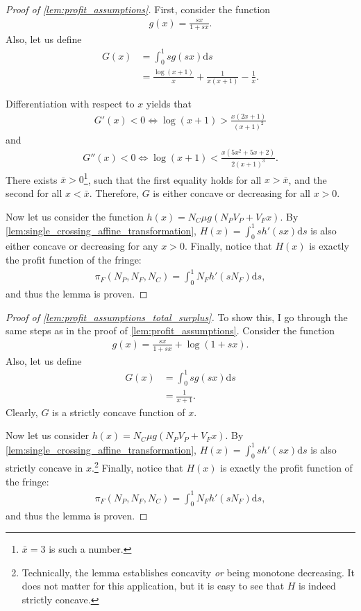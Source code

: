 \documentclass[a4paper]{article}
\newcommand{\ds}{\mathrm{d}s}
\begin{document}
\begin{proof}[Proof of \cref{lem:profit_assumptions}]
    First, consider the function
    \begin{align*}
        g(x) = \frac{sx}{1 + sx}.
    \end{align*}
    Also, let us define
    \begin{align*}
        G(x) &= \int_0^1 s g(sx) \ds \\
        &= \frac{\log(x+1)}{x} + \frac{1}{x(x+1)} - \frac{1}{x}.
    \end{align*}

    Differentiation with respect to $x$ yields that
    \begin{align*}
        G'(x) < 0 \iff \log(x+1) > \frac{x (2x+1)}{(x+1)^2}
    \end{align*}
    and
    \begin{align*}
        G''(x) < 0 \iff \log(x+1) < \frac{x (5x^2 + 5x + 2)}{2 (x+1)^3}.
    \end{align*}
    There exists $\bar{x} > 0$\footnote{
        $\bar{x} = 3$ is such a number.
    }, such that the first equality holds for all $x > \bar{x}$, and the second for all $x < \bar{x}$.
    Therefore, $G$ is either concave or decreasing for all $x > 0$.

    Now let us consider the function $h(x) = N_C \mu g(N_P V_P + V_F x)$.
    By \cref{lem:single_crossing_affine_transformation}, $H(x) = \int_0^1 s h'(sx) \ds$ is also either concave or decreasing for any $x > 0$.
    Finally, notice that $H(x)$ is exactly the profit function of the fringe:
    \begin{align*}
        \pi_F(N_P, N_F, N_C) = \int_0^1 N_F h'(s N_F) \ds,
    \end{align*}
    and thus the lemma is proven.
\end{proof}


\begin{proof}[Proof of \cref{lem:profit_assumptions_total_surplus}]
    To show this, I go through the same steps as in the proof of \cref{lem:profit_assumptions}.
    Consider the function
    \begin{align*}
        g(x) = \frac{sx}{1 + sx} + \log(1 + sx).
    \end{align*}
    Also, let us define
    \begin{align*}
        G(x) &= \int_0^1 s g(sx) \ds \\
        &= \frac{1}{x + 1}.
    \end{align*}
    Clearly, $G$ is a strictly concave function of $x$.

    Now let us consider $h(x) = N_C \mu g(N_P V_P + V_F x).$
    By \cref{lem:single_crossing_affine_transformation}, $H(x) = \int_0^1 s h'(sx) \ds$ is also strictly concave in $x$.\footnote{
        Technically, the lemma establishes concavity \emph{or} being monotone decreasing.
        It does not matter for this application, but it is easy to see that $H$ is indeed strictly concave.
    }
    Finally, notice that $H(x)$ is exactly the profit function of the fringe:
    \begin{align*}
        \pi_F(N_P, N_F, N_C) = \int_0^1 N_F h'(s N_F) \ds,
    \end{align*}
    and thus the lemma is proven.
\end{proof}
\end{document}
